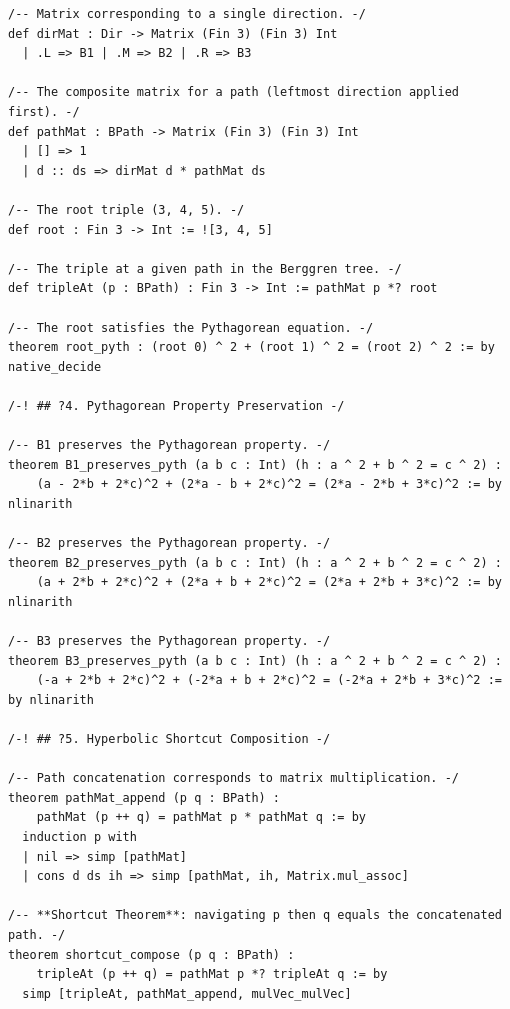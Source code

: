 \documentclass[11pt,twoside,openright]{book}
\theoremstyle{definition}
\theoremstyle{remark}
\begin{document}
\begin{lstlisting}[style=lean]
/-- Matrix corresponding to a single direction. -/
def dirMat : Dir -> Matrix (Fin 3) (Fin 3) Int
  | .L => B1 | .M => B2 | .R => B3

/-- The composite matrix for a path (leftmost direction applied first). -/
def pathMat : BPath -> Matrix (Fin 3) (Fin 3) Int
  | [] => 1
  | d :: ds => dirMat d * pathMat ds

/-- The root triple (3, 4, 5). -/
def root : Fin 3 -> Int := ![3, 4, 5]

/-- The triple at a given path in the Berggren tree. -/
def tripleAt (p : BPath) : Fin 3 -> Int := pathMat p *? root

/-- The root satisfies the Pythagorean equation. -/
theorem root_pyth : (root 0) ^ 2 + (root 1) ^ 2 = (root 2) ^ 2 := by native_decide

/-! ## ?4. Pythagorean Property Preservation -/

/-- B1 preserves the Pythagorean property. -/
theorem B1_preserves_pyth (a b c : Int) (h : a ^ 2 + b ^ 2 = c ^ 2) :
    (a - 2*b + 2*c)^2 + (2*a - b + 2*c)^2 = (2*a - 2*b + 3*c)^2 := by nlinarith

/-- B2 preserves the Pythagorean property. -/
theorem B2_preserves_pyth (a b c : Int) (h : a ^ 2 + b ^ 2 = c ^ 2) :
    (a + 2*b + 2*c)^2 + (2*a + b + 2*c)^2 = (2*a + 2*b + 3*c)^2 := by nlinarith

/-- B3 preserves the Pythagorean property. -/
theorem B3_preserves_pyth (a b c : Int) (h : a ^ 2 + b ^ 2 = c ^ 2) :
    (-a + 2*b + 2*c)^2 + (-2*a + b + 2*c)^2 = (-2*a + 2*b + 3*c)^2 := by nlinarith

/-! ## ?5. Hyperbolic Shortcut Composition -/

/-- Path concatenation corresponds to matrix multiplication. -/
theorem pathMat_append (p q : BPath) :
    pathMat (p ++ q) = pathMat p * pathMat q := by
  induction p with
  | nil => simp [pathMat]
  | cons d ds ih => simp [pathMat, ih, Matrix.mul_assoc]

/-- **Shortcut Theorem**: navigating p then q equals the concatenated path. -/
theorem shortcut_compose (p q : BPath) :
    tripleAt (p ++ q) = pathMat p *? tripleAt q := by
  simp [tripleAt, pathMat_append, mulVec_mulVec]


\end{lstlisting}
\end{document}
